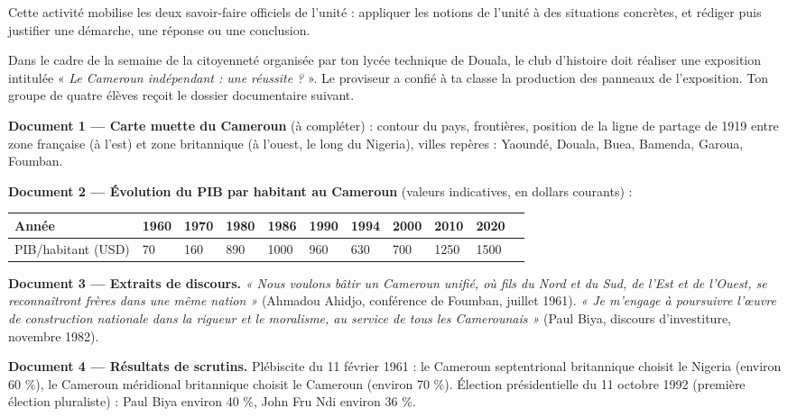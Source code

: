 \documentclass[11pt]{article}
\newcounter{popsec}
\newcounter{popsub}
\newcommand{\courssub}[1]{%
  \stepcounter{popsub}%
  \par\vspace{9pt}\noindent{\popxbold\fontsize{11.5}{13}\selectfont\color{popink}{\color{poporange}\thepopsec.\thepopsub}\hspace{6pt}#1}\par\nopagebreak\vspace{4pt}
}
\begin{document}
\begin{aretenir}
Cette activité mobilise les deux savoir-faire officiels de l'unité : appliquer les notions de l'unité à des situations concrètes, et rédiger puis justifier une démarche, une réponse ou une conclusion.
\end{aretenir}

\courssub{Situation}

Dans le cadre de la semaine de la citoyenneté organisée par ton lycée technique de Douala, le club d'histoire doit réaliser une exposition intitulée « \emph{Le Cameroun indépendant : une réussite ?} ». Le proviseur a confié à ta classe la production des panneaux de l'exposition. Ton groupe de quatre élèves reçoit le dossier documentaire suivant.

\textbf{Document 1 — Carte muette du Cameroun} (à compléter) : contour du pays, frontières, position de la ligne de partage de 1919 entre zone française (à l'est) et zone britannique (à l'ouest, le long du Nigeria), villes repères : Yaoundé, Douala, Buea, Bamenda, Garoua, Foumban.

\textbf{Document 2 — Évolution du PIB par habitant au Cameroun} (valeurs indicatives, en dollars courants) :

\begin{center}
\begin{tabularx}{\linewidth}{|l|X|X|X|X|X|X|X|X|X|X|}
\hline
\rowcolor{popblueL} Année & 1960 & 1970 & 1980 & 1986 & 1990 & 1994 & 2000 & 2010 & 2020 \\
\hline PIB/habitant (USD) & 70 & 160 & 890 & 1000 & 960 & 630 & 700 & 1250 & 1500 \\
\hline
\end{tabularx}
\end{center}

\textbf{Document 3 — Extraits de discours.} \emph{« Nous voulons bâtir un Cameroun unifié, où fils du Nord et du Sud, de l'Est et de l'Ouest, se reconnaîtront frères dans une même nation »} (Ahmadou Ahidjo, conférence de Foumban, juillet 1961). \emph{« Je m'engage à poursuivre l'œuvre de construction nationale dans la rigueur et le moralisme, au service de tous les Camerounais »} (Paul Biya, discours d'investiture, novembre 1982).

\textbf{Document 4 — Résultats de scrutins.} Plébiscite du 11 février 1961 : le Cameroun septentrional britannique choisit le Nigeria (environ 60 \%), le Cameroun méridional britannique choisit le Cameroun (environ 70 \%). Élection présidentielle du 11 octobre 1992 (première élection pluraliste) : Paul Biya environ 40 \%, John Fru Ndi environ 36 \%.
\end{document}
